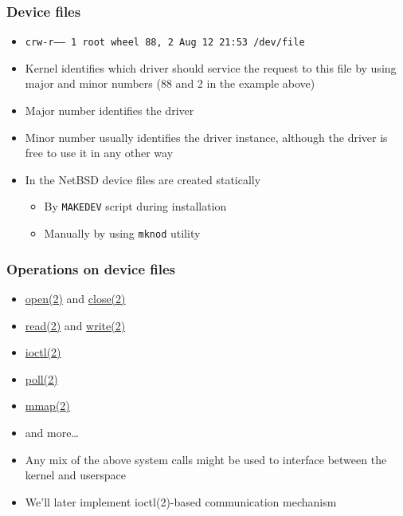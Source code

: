 \documentclass[dvipsnames,table]{beamer}
\begin{document}
\begin{frame}
\frametitle{Device files}
\begin{itemize}
	\scriptsize
	\item {\tt crw-r-----  1 root  wheel  88, 2 Aug 12 21:53 /dev/file}
	\normalsize
	\item Kernel identifies which driver should service the request to this file by using major and minor numbers (88 and 2 in the example above)
	\item Major number identifies the driver
	\item Minor number usually identifies the driver instance, although the driver is free to use it in any other way
	\item In the NetBSD device files are created statically
	\begin{itemize}
		\item By {\tt MAKEDEV} script during installation
		\item Manually by using {\tt mknod} utility
	\end{itemize}
\end{itemize}
\end{frame}

\begin{frame}
\frametitle{Operations on device files}
\begin{itemize}
	\item \href{http://netbsd.gw.com/cgi-bin/man-cgi?read++NetBSD-current}{open(2)} and \href{http://netbsd.gw.com/cgi-bin/man-cgi?read++NetBSD-current}{close(2)}
	\item \href{http://netbsd.gw.com/cgi-bin/man-cgi?read++NetBSD-current}{read(2)} and \href{http://netbsd.gw.com/cgi-bin/man-cgi?write++NetBSD-current}{write(2)}
	\item \href{http://netbsd.gw.com/cgi-bin/man-cgi?write++NetBSD-current}{ioctl(2)}
	\item \href{http://netbsd.gw.com/cgi-bin/man-cgi?poll++NetBSD-current}{poll(2)}
	\item \href{http://netbsd.gw.com/cgi-bin/man-cgi?write++NetBSD-current}{mmap(2)}
	\item and more\dots
	\item Any mix of the above system calls might be used to interface between the kernel and userspace
	\item We'll later implement ioctl(2)-based communication mechanism

\end{itemize}
\end{frame}
\end{document}
